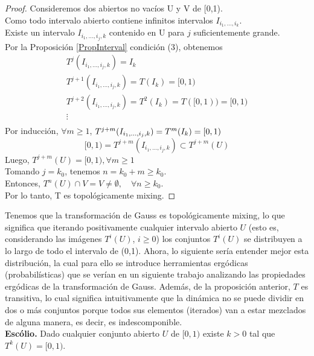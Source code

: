 \begin{proof}
Consideremos dos abiertos no vacíos U y V de [0,1).
\\
Como todo intervalo abierto contiene infinitos intervalos $I_{i_{1}, \ldots, i_{k}}$.
\\
Existe un intervalo $I_{i_{1}, \ldots, i_{j}, k}$ contenido en U para $j$ suficientemente grande.
\\
Por la Proposición \ref{PropInterval} condición (3), obtenemos
\\
$$
\begin{array}{l}
T^{j}(I_{i_{1}, \ldots, i_{j},k})=I_{k}\\
T^{j+1}(I_{i_{1}, \ldots, i_{j},k})=T(I_{k})=[0,1)\\
T^{j+2}(I_{i_{1}, \ldots, i_{j},k})=T^{2}(I_{k})=T([0,1))=[0,1)\\
\vdots\\
\end{array}
$$
Por inducción, $\forall m\geq1$, $T^{j+m}(I_{i_{1}, \ldots, i_{j},k})=T^{m}(I_{k})=[0,1)\\$
$$
[0,1)=T^{j+m}\left(I_{i_{1}, \ldots, i_{j},k}\right)\subset T^{j+m}(U)$$
Luego, $T^{j+m}(U)=[0,1), \forall m \geqslant 1$
\\
Tomando $j=k_{0}$, tenemos $n=k_{0}+m\geq k_{0}$.
\\
Entonces, $T^{n}(U) \cap V=V \neq \emptyset ,\quad \forall n\geq k_{0}$.
\\
Por lo tanto, T es topológicamente mixing.
\end{proof} 

Tenemos que la transformación de Gauss es topológicamente mixing, lo que significa que iterando positivamente cualquier intervalo abierto $U$ (esto es, considerando las imágenes $T^{i}(U)$, $i\geq0$) los conjuntos $T^{i}(U)$ se distribuyen a lo largo de todo el intervalo de (0,1). Ahora, lo siguiente sería entender mejor esta distribución, la cual para ello se introduce herramientas ergódicas (probabilísticas) que se verían en un siguiente trabajo analizando las propiedades ergódicas de la transformación de Gauss. Además, de la proposición anterior, $T$ es transitiva, lo cual significa intuitivamente que la dinámica no se puede dividir en dos o más conjuntos porque todos sus elementos (iterados) van a estar mezclados de alguna manera, es decir, es indescomponible.
\\

\textbf{Escólio.} Dado cualquier conjunto abierto $U$ de $[0,1)$ existe $k>0$ tal que $T^{k}(U)=[0,1)$.
\\

